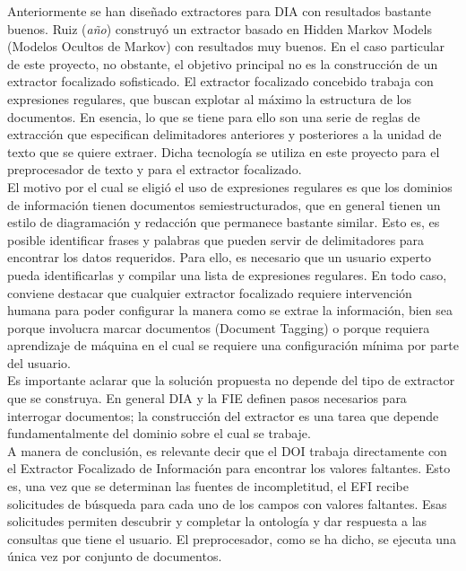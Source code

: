 Anteriormente se han diseñado extractores para DIA con resultados bastante buenos. Ruiz (\emph{año}) \cite{ruiz-HMM} construyó un extractor basado en Hidden Markov Models (Modelos Ocultos de Markov) con resultados muy buenos. En el caso particular de este proyecto, no obstante, el objetivo principal no es la construcción de un extractor focalizado sofisticado. El extractor focalizado concebido trabaja con expresiones regulares, que buscan explotar al máximo la estructura de los documentos. En esencia, lo que se tiene para ello son una serie de reglas de extracción que especifican delimitadores anteriores y posteriores a la unidad de texto que se quiere extraer. Dicha tecnología se utiliza en este proyecto para el preprocesador de texto y para el extractor focalizado.\\

El motivo por el cual se eligió el uso de expresiones regulares es que los dominios de información tienen documentos semiestructurados,  que en general tienen un estilo de diagramación y redacción que permanece bastante similar. Esto es, es posible identificar frases y palabras que pueden servir de delimitadores para encontrar los datos requeridos. Para ello, es necesario que un usuario experto pueda identificarlas y compilar una lista de expresiones regulares. En todo caso, conviene destacar que cualquier extractor focalizado requiere intervención humana para poder configurar la manera como se extrae la información, bien sea porque involucra marcar documentos (Document Tagging) o porque requiera aprendizaje de máquina en el cual se requiere una configuración mínima por parte del usuario.\\

Es importante aclarar que la solución propuesta no depende del tipo de extractor que se construya. En general DIA y la FIE definen pasos necesarios para interrogar documentos; la construcción del extractor es una tarea que depende fundamentalmente del dominio sobre el cual se trabaje. \\

A manera de conclusión, es relevante decir que el DOI trabaja directamente con el Extractor Focalizado de Información para encontrar los valores faltantes. Esto es, una vez que se determinan las fuentes de incompletitud, el EFI recibe solicitudes de búsqueda para cada uno de los campos con valores faltantes. Esas solicitudes permiten descubrir y completar la ontología y dar respuesta a las consultas que tiene el usuario. El preprocesador, como se ha dicho, se ejecuta una única vez por conjunto de documentos. \\

